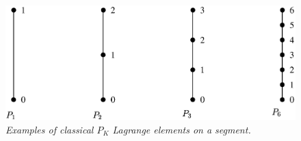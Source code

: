 \documentclass[11pt,a4paper]{article}
\begin{document}
\begin{figure}[H] 
  \begin{center} 
    \includegraphics[width=14cm,angle=0]{getfemlist_segment_Pk.eps}
    \caption{ \it Examples of classical $P_K$ Lagrange elements on a segment.} \label{fig:segmentpk}
  \end{center}
\end{figure}
\end{document}

